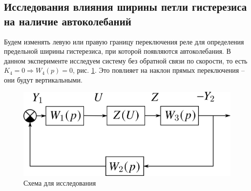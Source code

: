 
	\subsection[Влияние ширины петли гистерезиса на автоколебания]{Исследования влияния ширины петли гистерезиса на наличие автоколебаний}
	
	Будем изменять левую или правую границу переключения реле для определения предельной ширины гистерезиса, при которой появляются автоколебания. В данном эксперименте исследуем систему без обратной связи по скорости, то есть $K_4 = 0 \Rightarrow W_4(p)=0$, рис. \ref{scheme2}. Это повлияет на наклон прямых переключения -- они будут вертикальными.
	
	\begin{figure}[h]
		\centering\includegraphics[width=.6\textwidth]{png/схема2.png}
		\caption{Схема для исследования}
		\label{scheme2}
	\end{figure}

